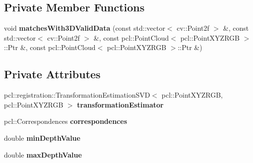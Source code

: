 \subsection*{Private Member Functions}
\begin{DoxyCompactItemize}
\item 
\hypertarget{class_visual3_d_rigid_transformation_estimator___s_v_d_af1fa6a350cc3c2474eba5b1378408456}{
void {\bfseries matchesWith3DValidData} (const std::vector$<$ cv::Point2f $>$ \&, const std::vector$<$ cv::Point2f $>$ \&, const pcl::PointCloud$<$ pcl::PointXYZRGB $>$::Ptr \&, const pcl::PointCloud$<$ pcl::PointXYZRGB $>$::Ptr \&)}
\label{class_visual3_d_rigid_transformation_estimator___s_v_d_af1fa6a350cc3c2474eba5b1378408456}

\end{DoxyCompactItemize}
\subsection*{Private Attributes}
\begin{DoxyCompactItemize}
\item 
\hypertarget{class_visual3_d_rigid_transformation_estimator___s_v_d_a24d05019fb93f19d200eb4cc8cfafc26}{
pcl::registration::TransformationEstimationSVD$<$ pcl::PointXYZRGB, pcl::PointXYZRGB $>$ {\bfseries transformationEstimator}}
\label{class_visual3_d_rigid_transformation_estimator___s_v_d_a24d05019fb93f19d200eb4cc8cfafc26}

\item 
\hypertarget{class_visual3_d_rigid_transformation_estimator___s_v_d_ae299454fce2ae52c5ea0a9f81e8a55a5}{
pcl::Correspondences {\bfseries correspondences}}
\label{class_visual3_d_rigid_transformation_estimator___s_v_d_ae299454fce2ae52c5ea0a9f81e8a55a5}

\item 
\hypertarget{class_visual3_d_rigid_transformation_estimator___s_v_d_a90621e4cc84c2d8251db3922f1c44582}{
double {\bfseries minDepthValue}}
\label{class_visual3_d_rigid_transformation_estimator___s_v_d_a90621e4cc84c2d8251db3922f1c44582}

\item 
\hypertarget{class_visual3_d_rigid_transformation_estimator___s_v_d_a08f88e98013c9eaad11c289fe45ceaa8}{
double {\bfseries maxDepthValue}}
\label{class_visual3_d_rigid_transformation_estimator___s_v_d_a08f88e98013c9eaad11c289fe45ceaa8}

\end{DoxyCompactItemize}


